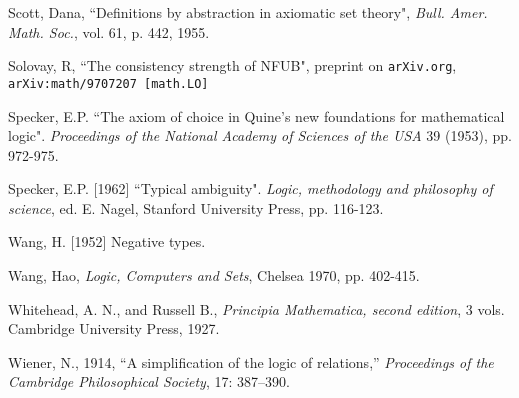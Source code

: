 \documentclass{article}
\begin{document}
\begin{thebibliography}{99}
  Scott, Dana, ``Definitions by abstraction in axiomatic set theory",  {\em Bull. Amer. Math.
Soc.}, vol. 61, p. 442, 1955.

  Solovay, R, ``The consistency strength of NFUB",  preprint on {\tt arXiv.org}, {\tt arXiv:math/9707207 [math.LO]}

  Specker, E.P.
``The axiom of choice in Quine's new foundations for mathematical logic". 
{\em Proceedings of the National Academy of Sciences of the USA\/} 39 (1953), pp. 972-975.

  Specker, E.P. [1962] 
``Typical ambiguity". 
{\em Logic, methodology and philosophy of science\/}, ed. E. Nagel, Stanford University Press, pp. 116-123.

  Wang, H. [1952] 
Negative types.

  Wang, Hao, {\em Logic, Computers and Sets\/}, Chelsea 1970, pp. 402-415.

  Whitehead, A. N.,  and Russell B., {\em Principia  Mathematica, second edition\/}, 3 vols.  Cambridge University Press, 1927.

 Wiener, N., 1914, ``A simplification of the logic of relations,”  {\em Proceedings of the Cambridge Philosophical Society\/}, 17: 387–390.



\end{thebibliography}

\newpage

\printindex
\end{document}
